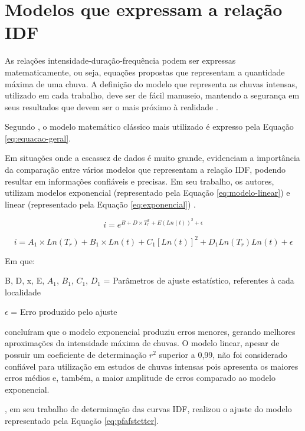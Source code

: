 \section{Modelos que expressam a relação IDF}

As relações intensidade-duração-frequência podem ser expressas matematicamente, ou seja, equações propostas que representam a quantidade máxima de uma chuva. A definição do modelo que representa as chuvas intensas, utilizado em cada trabalho, deve ser de fácil manuseio, mantendo a segurança em seus resultados que devem ser o mais próximo à realidade \cite{interpolacao-chuva}.

Segundo , o modelo matemático clássico mais utilizado é expresso pela Equação \ref{eq:equacao-geral}.

Em situações onde a escassez de dados é muito grande, evidenciam a importância da comparação entre vários modelos que representam a relação IDF, podendo resultar em informações confiáveis e precisas. Em seu trabalho, os autores, utilizam modelos exponencial (representado pela Equação \ref{eq:modelo-linear}) e linear (representado pela Equação \ref{eq:exponencial}) \cite{interpolacao-chuva}.

\begin{equation}
\label{eq:modelo-linear}
    i = e^{B + D \times T_r^x + E (Ln(t))^2 + \epsilon}
\end{equation}

\begin{equation}
\label{eq:exponencial}
    i = A_1 \times Ln(T_r) + B_1 \times Ln(t) + C_1[Ln(t)]^2 + D_1Ln(T_r)Ln(t) + \epsilon
\end{equation}

Em que:

B, D, x, E, $A_1$, $B_1$, $C_1$, $D_1$ = Parâmetros de ajuste estatístico, referentes à cada localidade

$\epsilon$ = Erro produzido pelo ajuste


 concluíram que o modelo exponencial produziu erros menores, gerando melhores aproximações da intensidade máxima de chuvas. O modelo linear, apesar de possuir um coeficiente de determinação $r^2$ superior a 0,99, não foi considerado confiável para utilização em estudos de chuvas intensas pois apresenta os maiores erros médios e, também, a maior amplitude de erros comparado ao modelo exponencial.

, em seu trabalho de determinação das curvas IDF, realizou o ajuste do modelo representado pela Equação \ref{eq:pfafstetter}.

